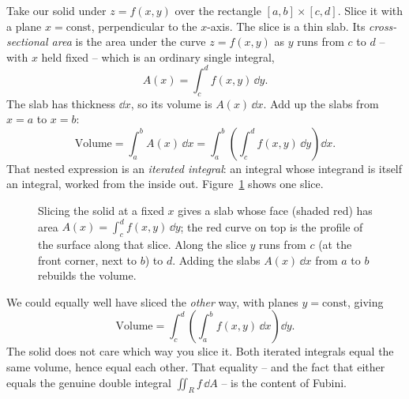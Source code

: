 Take our solid under $z=f(x,y)$ over the rectangle $[a,b]\times[c,d]$. Slice it
with a plane $x=\text{const}$, perpendicular to the $x$-axis. The slice is a thin
slab. Its \emph{cross-sectional area} is the area under the curve
$z=f(x,y)$ as $y$ runs from $c$ to $d$ -- with $x$ held fixed -- which is an
ordinary single integral,
\[
  A(x)=\int_c^d f(x,y)\,\dd y .
\]
The slab has thickness $\dd x$, so its volume is $A(x)\,\dd x$. Add up the slabs
from $x=a$ to $x=b$:
\[
  \text{Volume}=\int_a^b A(x)\,\dd x
             =\int_a^b\!\left(\int_c^d f(x,y)\,\dd y\right)\dd x .
\]
That nested expression is an \emph{iterated integral}: an integral whose
integrand is itself an integral, worked from the inside out.
Figure~\ref{ch34:fig-slice} shows one slice.

\begin{figure}[htbp]
\centering
{}
\caption{Slicing the solid at a fixed $x$ gives a slab whose face (shaded red)
has area $A(x)=\int_c^d f(x,y)\,\dd y$; the red curve on top is the profile of
the surface along that slice. Along the slice $y$ runs from $c$ (at the front
corner, next to $b$) to $d$. Adding the slabs $A(x)\,\dd x$ from $a$ to $b$
rebuilds the volume.}
\label{ch34:fig-slice}
\end{figure}

We could equally well have sliced the \emph{other} way, with planes
$y=\text{const}$, giving
\[
  \text{Volume}=\int_c^d\!\left(\int_a^b f(x,y)\,\dd x\right)\dd y .
\]
The solid does not care which way you slice it. Both iterated integrals equal the
same volume, hence equal each other. That equality -- and the fact that either
equals the genuine double integral $\iint_R f\,\dd A$ -- is the content of
Fubini.

